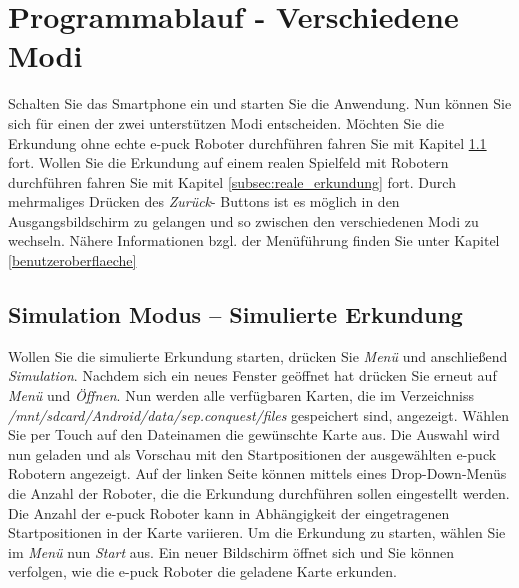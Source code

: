 \documentclass[10pt,a4paper]{article}
\let\oldsection\section
\renewcommand{\section}{\newpage \oldsection}
\begin{document}
\section{Programmablauf - Verschiedene Modi}
\label{programmstart_ablauf}
		Schalten Sie das Smartphone ein und starten Sie die Anwendung. Nun k\"onnen Sie sich f\"ur einen der zwei unterst\"utzen Modi entscheiden. M\"ochten Sie
		die Erkundung ohne echte e-puck Roboter durchf\"uhren fahren Sie mit  Kapitel \ref{subsec:simulierte_erkundung} fort. Wollen Sie die Erkundung auf einem
		realen Spielfeld mit Robotern durchf\"uhren fahren Sie mit Kapitel  \ref{subsec:reale_erkundung} fort. Durch mehrmaliges Dr\"ucken des \textit{Zur\"uck}-
		Buttons ist es m\"oglich in den Ausgangsbildschirm zu gelangen und so zwischen den verschiedenen Modi zu wechseln. N\"ahere Informationen bzgl. der 			
		Men\"uf\"uhrung finden Sie unter Kapitel \ref{benutzeroberflaeche}
	\subsection{Simulation Modus -- Simulierte Erkundung}
	\label{subsec:simulierte_erkundung}
		Wollen Sie die simulierte Erkundung starten, dr\"ucken Sie \textit{Men\"u} und anschlie\ss end \textit{Simulation}. Nachdem sich ein neues Fenster ge\"offnet hat
		dr\"ucken Sie erneut auf  \textit{Men\"u} und \textit{\"Offnen}. Nun werden alle verf\"ugbaren Karten, die im Verzeichniss 
		\textit{/mnt/sdcard/Android/data/sep.conquest/files} gespeichert sind, angezeigt. W\"ahlen Sie per Touch auf den Dateinamen die gew\"unschte Karte aus. Die
		Auswahl wird nun geladen und als Vorschau mit den Startpositionen der ausgew\"ahlten e-puck Robotern angezeigt. Auf der linken Seite k\"onnen mittels eines 
		Drop-Down-Men\"us die Anzahl der Roboter, die die Erkundung durchf\"uhren sollen eingestellt werden. Die Anzahl der e-puck 	Roboter kann in Abh\"angigkeit 
		der eingetragenen Startpositionen in der Karte variieren. Um die Erkundung zu starten, w\"ahlen Sie im \textit{Men\"u} nun \textit{Start} aus. Ein neuer Bildschirm 
		\"offnet sich und Sie k\"onnen verfolgen, wie die e-puck Roboter  die geladene Karte erkunden.
\end{document}
